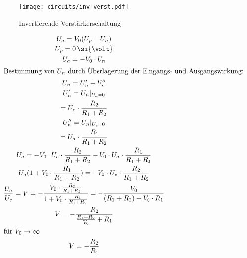   \begin{figure}[H]
\begin{center}
    \texttt{[image: circuits/inv\_verst.pdf]}
\end{center}
    \caption{Invertierende Verstärkerschaltung}
  \end{figure}

\begin{gather*}
  U_a = V_0(U_p-U_n)\\
  U_p = 0 \, \si{\volt}\\
  U_a = -V_0 \cdot U_n\\
  \intertext{Bestimmung von $U_n$ durch Überlagerung der Eingangs- und
    Ausgangswirkung:}
  U_n = U_n' + U_n''\\
  U_n' = U_n|_{U_a=0}\\
  = U_e \cdot \frac{R_2}{R_1 + R_2}\\
  U_n'' = U_n|_{U_e=0}\\
  = U_a \cdot \frac{R_1}{R_1 + R_2}\\
  U_a = -V_0 \cdot U_e \cdot \frac{R_2}{R_1+R_2} - V_0 \cdot U_a \cdot
  \frac{R_1}{R_1+R_2}\\
  U_a (1 + V_0 \cdot \frac{R_1}{R_1+R_2}) = -V_0 \cdot U_e \cdot \frac{R_2}{R_1+R_2}\\
  \frac{U_a}{U_e} = V = - \frac{V_0 \cdot \frac{R_2}{R_1+R_2}}{1+V_0 \cdot
    \frac{R_1}{R_1+R_2}} = - \frac{V_0}{(R_1+R_2) + V_0 \cdot R_1}\\
  V = - \frac{R_2}{\frac{R_1+R_2}{V_0} + R_1}\\
  \intertext{für $V_0 \rightarrow \infty$}
  V = -\frac{R_2}{R_1}
\end{gather*}